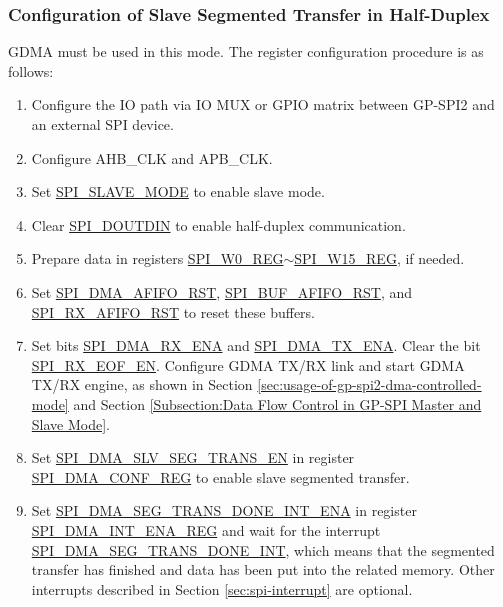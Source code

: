 \documentclass[main\_\_EN.tex]{subfiles}
\begin{document}
\subsubsection{Configuration of Slave Segmented Transfer in Half-Duplex}\label{sec:gp-spi2-slave-hd-seg-trans}

GDMA must be used in this mode. The register configuration procedure is as follows:

\begin{enumerate}
   \item Configure the IO path via IO MUX or GPIO matrix between GP-SPI2 and an external SPI device.
   \item Configure AHB\_CLK and APB\_CLK.
    \item Set \hyperref[fielddesc:SPISLAVEMODE]{SPI\_SLAVE\_MODE} to enable slave mode.
    \item Clear \hyperref[fielddesc:SPIDOUTDIN]{SPI\_DOUTDIN} to enable half-duplex communication.
    \item Prepare data in registers \hyperref[regdesc:SPIW0REG]{SPI\_W0\_REG}$\sim$\hyperref[regdesc:SPIW15REG]{SPI\_W15\_REG}, if needed.
    \item Set \hyperref[fielddesc:SPIDMAAFIFORST]{SPI\_DMA\_AFIFO\_RST}, \hyperref[fielddesc:SPIBUFAFIFORST]{SPI\_BUF\_AFIFO\_RST}, and \hyperref[fielddesc:SPIRXAFIFORST]{SPI\_RX\_AFIFO\_RST} to reset these buffers.
    \item Set bits \hyperref[fielddesc:SPIDMARXENA]{SPI\_DMA\_RX\_ENA} and \hyperref[fielddesc:SPIDMATXENA]{SPI\_DMA\_TX\_ENA}. Clear the bit \hyperref[fielddesc:SPIRXEOFEN]{SPI\_RX\_EOF\_EN}. Configure GDMA TX/RX link and start GDMA TX/RX engine, as shown in Section \ref{sec:usage-of-gp-spi2-dma-controlled-mode} and Section \ref{Subsection:Data Flow Control in GP-SPI Master and Slave Mode}.
    \item Set \hyperref[fielddesc:SPIDMASLVSEGTRANSEN]{SPI\_DMA\_SLV\_SEG\_TRANS\_EN} in register \hyperref[regdesc:SPIDMACONFREG]{SPI\_DMA\_CONF\_REG} to enable slave segmented transfer.
    \item Set \hyperref[fielddesc:SPIDMASEGTRANSDONEINTENA]{SPI\_DMA\_SEG\_TRANS\_DONE\_INT\_ENA} in register \hyperref[regdesc:SPIDMAINTENAREG]{SPI\_DMA\_INT\_ENA\_REG} and wait for the interrupt \hyperref[int:SPIDMASEGTRANSDONEINT]{SPI\_DMA\_SEG\_TRANS\_DONE\_INT}, which means that the segmented transfer has finished and data has been put into the related memory. Other interrupts described in Section \ref{sec:spi-interrupt} are optional.
\end{enumerate}
\end{document}
